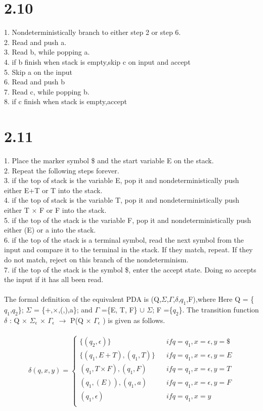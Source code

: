 \documentclass{scrartcl}
\begin{document}
\section*{2.10}
1. Nondeterministically branch to either step 2 or step 6.\\
2. Read and push a.\\
3. Read b, while popping a.\\
4. if b finish when stack is empty,skip c on input and accept\\
5. Skip a on the input\\
6. Read and push b\\
7. Read c, while popping b.\\
8. if c finish when stack is empty,accept

\section*{2.11}
1. Place the marker symbol \$ and the start variable E on the stack.\\
2. Repeat the following steps forever. \\
3. if the top of stack is the variable E, pop it and nondeterministically push either E+T or T into the stack.\\
4. if the top of stack is the variable T, pop it and nondeterministically push either T  $\times$  F or F into the stack.\\
5. if the top of the stack is the variable F, pop it and nondeterministically push either (E) or a into the stack.\\
6. if the top of the stack is a terminal symbol, read the next symbol from the input and compare it to the terminal in the stack. If they match, repeat. If they do not match, reject on this branch of the nondeterminism.\\
7. if the top of the stack is the symbol \$, enter the accept state. Doing so accepts the input if it has all been read.\\
\\
The formal definition of the equivalent PDA is (Q,$\Sigma$,$\Gamma$,$\delta$,$q_1$,F),where Here Q = \{$q_1$,$q_2$\}; $\Sigma$ = \{+,$\times$,(,),a\}; and $\Gamma$ =\{E, T, F\} $\cup$ $\Sigma$; F =\{$q_2$\}. The transition function $\delta$ : Q $\times$ ${\Sigma}_\epsilon$  $\times$ $\Gamma_\epsilon$ $\rightarrow$ P(Q $\times$ $\Gamma_\epsilon$ ) is given as follows.\\
\\
\begin{equation}
{\delta}(q,x,y)=\left\{
\begin{array}{rcl}
\{(q_2,\epsilon)\} & & { if q=q_1,x=\epsilon, y=\$}\\
\{(q_1,E+T),(q_1,T)\} & & {if q=q_1,x=\epsilon,y=E}\\
{(q_1,T \times F), (q_1, F)} & & {if q=q_1, x=\epsilon,y=T}\\
{(q_1,(E)),(q_1,a)} & & {if q=q_1,x=\epsilon,y=F}\\
{(q_1,\epsilon)} & & {if q=q_1,x=y}\\
\end{array} \right.
\end{equation}
\end{document}
